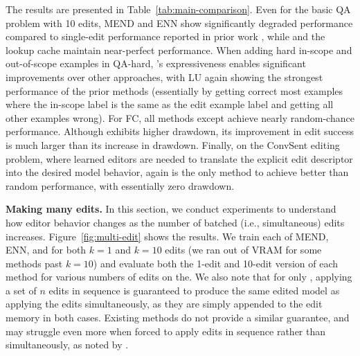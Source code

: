 \documentclass{article}
\begin{document}
The results are presented in Table~\ref{tab:main-comparison}.
Even for the basic QA problem with 10 edits, MEND and ENN show significantly degraded performance compared to single-edit performance reported in prior work \citep{mitchell2021fast}, while {\name} and the lookup cache maintain near-perfect performance. When adding hard in-scope and out-of-scope examples in QA-hard, {\name}'s expressiveness enables significant improvements over other approaches, with LU again showing the strongest performance of the prior methods (essentially by getting correct most examples where the in-scope label is the same as the edit example label and getting all other examples wrong). For FC, all methods except {\name} achieve nearly random-chance performance. Although {\name} exhibits higher drawdown, its improvement in edit success is much larger than its increase in drawdown. Finally, on the ConvSent editing problem, where learned editors are needed to translate the explicit edit descriptor into the desired model behavior, {\name} again is the only method to achieve better than random performance, with essentially zero drawdown.



\textbf{Making many edits.}
In this section, we conduct experiments to understand how editor behavior changes as the number of batched (i.e., simultaneous) edits increases. Figure~\ref{fig:multi-edit} shows the results.
We train each of MEND, ENN, and {\name} for both $k=1$ and $k=10$ edits (we ran out of VRAM for some methods past $k=10$) and evaluate both the 1-edit and 10-edit version of each method for various numbers of edits on the.
We also note that for only {\name}, applying a set of $n$ edits in sequence is guaranteed to produce the same edited model as applying the edits simultaneously, as they are simply appended to the edit memory in both cases. Existing methods do not provide a similar guarantee, and may struggle even more when forced to apply edits in sequence rather than simultaneously, as noted by \citet{hase2021language}.


\end{document}
